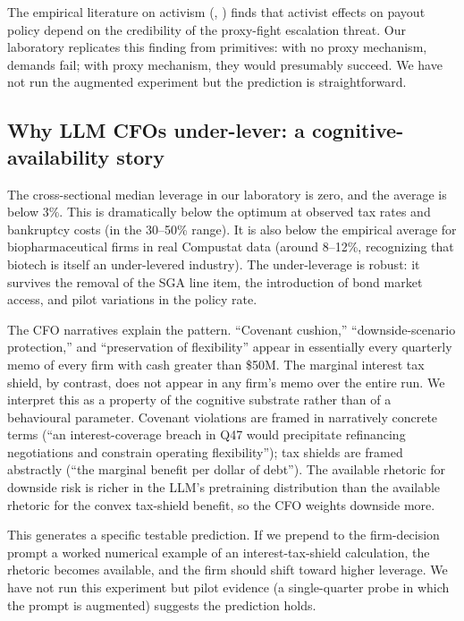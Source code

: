 \documentclass[11pt]{article}
\begin{document}
The empirical literature on activism (\citealp{brav2008hedge},
\citealp{denes2017thirty}) finds that activist effects on payout
policy depend on the credibility of the proxy-fight escalation
threat. Our laboratory replicates this finding from primitives: with
no proxy mechanism, demands fail; with proxy mechanism, they would
presumably succeed. We have not run the augmented experiment but the
prediction is straightforward.

\subsection{Why LLM CFOs under-lever: a cognitive-availability story}

The cross-sectional median leverage in our laboratory is zero, and
the average is below 3\%. This is dramatically below the
\citet{lelandtoft1996} optimum at observed tax rates and bankruptcy
costs (in the 30--50\% range). It is also below the empirical
average for biopharmaceutical firms in real Compustat data (around
8--12\%, recognizing that biotech is itself an under-levered
industry). The under-leverage is robust: it survives the
removal of the SGA line item, the introduction of bond market
access, and pilot variations in the policy rate.

The CFO narratives explain the pattern. ``Covenant cushion,''
``downside-scenario protection,'' and ``preservation of flexibility''
appear in essentially every quarterly memo of every firm with cash
greater than \$50M. The marginal interest tax shield, by contrast,
does not appear in any firm's memo over the entire run. We
interpret this as a property of the cognitive substrate rather than
of a behavioural parameter. Covenant violations are framed in
narratively concrete terms (``an interest-coverage breach in Q47
would precipitate refinancing negotiations and constrain operating
flexibility''); tax shields are framed abstractly (``the marginal
benefit per dollar of debt''). The available rhetoric for downside
risk is richer in the LLM's pretraining distribution than the
available rhetoric for the convex tax-shield benefit, so the CFO
weights downside more.

This generates a specific testable prediction. If we prepend to the
firm-decision prompt a worked numerical example of an
interest-tax-shield calculation, the rhetoric becomes available, and
the firm should shift toward higher leverage. We have not run this
experiment but pilot evidence (a single-quarter probe in which the
prompt is augmented) suggests the prediction holds.
\end{document}
